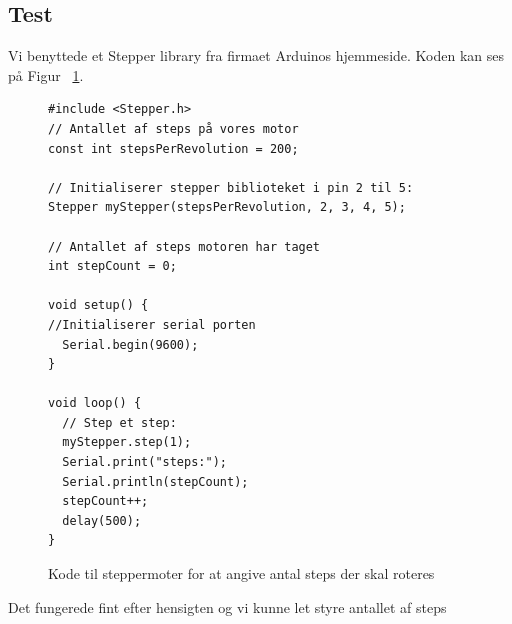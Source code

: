 \subsection{Test}
Vi benyttede et Stepper library fra firmaet Arduinos hjemmeside\cite{steppercode:stepbystep}. Koden kan ses på Figur ~\ref{kode:steptest}.

\begin{figure}[H] \label{kode:steptest}
\caption{Kode til steppermoter for at angive antal steps der skal roteres}
\begin{lstlisting}
#include <Stepper.h>
// Antallet af steps på vores motor
const int stepsPerRevolution = 200;  

// Initialiserer stepper biblioteket i pin 2 til 5:
Stepper myStepper(stepsPerRevolution, 2, 3, 4, 5);

// Antallet af steps motoren har taget
int stepCount = 0;         

void setup() {
//Initialiserer serial porten
  Serial.begin(9600);
}

void loop() {
  // Step et step:
  myStepper.step(1);
  Serial.print("steps:");
  Serial.println(stepCount);
  stepCount++;
  delay(500);
}
\end{lstlisting}
\end{figure}

Det fungerede fint efter hensigten og vi kunne let styre antallet af steps

